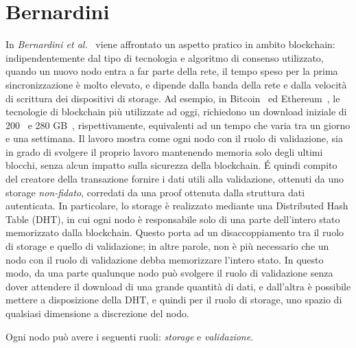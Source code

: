 \section{Bernardini}\label{sec:bernardini}
In \emph{Bernardini et al.}~\cite{bernardini2019blockchains} viene affrontato un aspetto pratico in ambito blockchain: indipendentemente dal tipo di tecnologia e algoritmo di consenso utilizzato, quando un nuovo nodo entra a far parte della rete, il tempo speso per la prima sincronizzazione è molto elevato, e dipende dalla banda della rete e dalla velocità di scrittura dei dispositivi di storage. Ad esempio, in Bitcoin~\cite{nakamoto2019bitcoin} ed Ethereum~\cite{wood2014ethereum}, le tecnologie di blockchain più utilizzate ad oggi, richiedono un download iniziale di 200~\cite{bitcoin2020fullnode} e 280 GB~\cite{ethereum2020chart}, rispettivamente, equivalenti ad un tempo che varia tra un giorno e una settimana.
Il lavoro mostra come ogni nodo con il ruolo di validazione, sia in grado di svolgere il proprio lavoro mantenendo memoria solo degli ultimi blocchi, senza alcun impatto sulla sicurezza della blockchain. \'E quindi compito del creatore della transazione fornire i dati utili alla validazione, ottenuti da uno storage \emph{non-fidato}, corredati da una proof ottenuta dalla struttura dati autenticata. In particolare, lo storage è realizzato mediante una Distributed Hash Table (DHT), in cui ogni nodo è responsabile solo di una parte dell'intero stato memorizzato dalla blockchain. Questo porta ad un disaccoppiamento tra il ruolo di storage e quello di validazione; in altre parole, non è più necessario che un nodo con il ruolo di validazione debba memorizzare l'intero stato. In questo modo, da una parte qualunque nodo può svolgere il ruolo di validazione senza dover attendere il download di una grande quantità di dati, e dall'altra è possibile mettere a disposizione della DHT, e quindi per il ruolo di storage, uno spazio di qualsiasi dimensione a discrezione del nodo.

Ogni nodo può avere i seguenti ruoli: \emph{storage} e \emph{validazione}.

